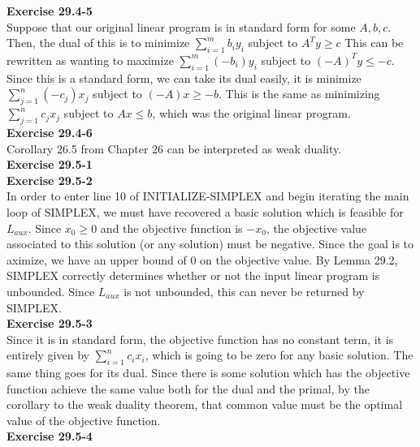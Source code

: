 \documentclass{article}
\begin{document}
\noindent\textbf{Exercise 29.4-5}\\

Suppose that our original linear program is in standard form for some $A,b,c$. Then, the dual of this is to minimize $\sum_{i=1}^m b_i y_i$ subject to $A^T y \ge c$ This can be rewritten as wanting to maximize $\sum_{i=1}^m (-b_i) y_i$ subject to $(-A)^T y \le -c$. Since this is a standard form, we can take its dual easily, it is minimize $\sum_{j=1}^n (-c_j) x_j$ subject to $(-A)x \ge -b$. This is the same as minimizing $\sum_{j=1}^n c_j x_j$ subject to $Ax \le b$, which was the original linear program.\\

\noindent\textbf{Exercise 29.4-6}\\

Corollary 26.5 from Chapter 26 can be interpreted as weak duality. \\

\noindent\textbf{Exercise 29.5-1}\\

\noindent\textbf{Exercise 29.5-2}\\

In order to enter line 10 of INITIALIZE-SIMPLEX and begin iterating the main loop of SIMPLEX, we must have recovered a basic solution which is feasible for $L_{aux}$. Since $x_0 \geq 0$ and the objective function is $-x_0$, the objective value associated to this solution (or any solution) must be negative. Since the goal is to aximize, we have an upper bound of 0 on the objective value. By Lemma 29.2, SIMPLEX correctly determines whether or not the input linear program is unbounded.  Since $L_{aux}$ is not unbounded, this can never be returned by SIMPLEX. \\

\noindent\textbf{Exercise 29.5-3}\\

Since it is in standard form, the objective function has no constant term, it is entirely given by $\sum_{i=1}^n c_i x_i$, which is going to be zero for any basic solution. The same thing goes for its dual. Since there is some solution which has the objective function achieve the same value both for the dual and the primal, by the corollary to the weak duality theorem, that common value must be the optimal value of the objective function.\\

\noindent\textbf{Exercise 29.5-4}\\
\end{document}
